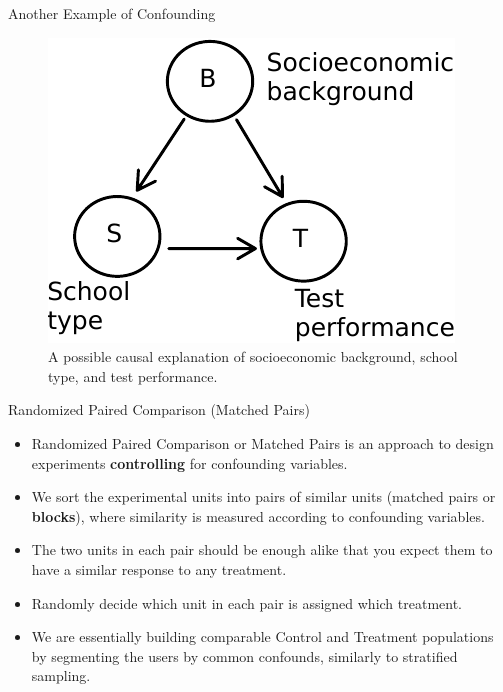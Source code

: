 \documentclass[handout]{beamer}
\begin{document}
\begin{frame}{Another Example of Confounding}
\scriptsize{

 \begin{figure}[h!]
	\centering
	\includegraphics[scale=0.9]{pics/school.pdf}
	\caption{A possible causal explanation of socioeconomic background, school type, and test performance.}
\end{figure}
 


} 
\end{frame}


\begin{frame}{Randomized Paired Comparison (Matched Pairs)}
\scriptsize{

\begin{itemize}

\item Randomized Paired Comparison or Matched Pairs is an approach to design experiments \textbf{controlling} for confounding variables. 

\item We sort the experimental units into pairs of similar units (matched pairs or \textbf{blocks}), where similarity is measured according to confounding variables.

\item  The two units in each pair should be enough alike that you expect them to have a similar response to any treatment.

\item Randomly decide which unit in each pair is assigned which treatment.

\item We are essentially building comparable Control and Treatment populations by segmenting the users by common confounds, similarly to stratified sampling.
  
\end{itemize}



} 
\end{frame}
\end{document}
